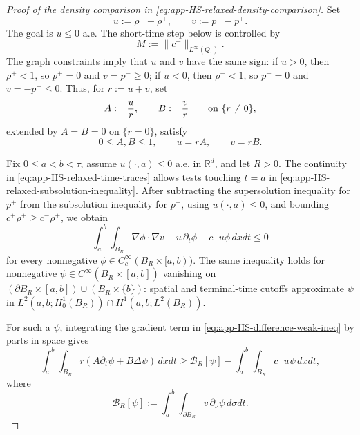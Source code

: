 \documentclass[11pt]{amsart}
\numberwithin{equation}{section}
\numberwithin{figure}{section}
\theoremstyle{plain}
\theoremstyle{definition}
\theoremstyle{remark}
\theoremstyle{plain}
\newcommand{\norm}[1]{\lVert #1 \rVert}
\def\R{\mathbb{R}}
\begin{document}
\begin{proof}[Proof of the density comparison in \eqref{eq:app-HS-relaxed-density-comparison}]
Set
\[
    u:=\rho^- -\rho^+,\qquad v:=p^- -p^+ .
\]
The goal is \(u\leq0\) a.e.  The short-time step below is controlled by
\begin{equation}\label{eq:app-HS-M-def}
    M:=\norm{c^-}_{L^\infty(Q_\tau)}.
\end{equation}
The graph constraints imply that \(u\) and \(v\) have the same sign:
if \(u>0\), then \(\rho^+<1\), so \(p^+=0\) and \(v=p^-\geq0\); if \(u<0\),
then \(\rho^-<1\), so \(p^-=0\) and \(v=-p^+\leq0\). Thus, for
\(r:=u+v\), set
\begin{equation}\label{eq:app-HS-AB-def}
    A:=\frac{u}{r},\qquad B:=\frac{v}{r}
    \qquad\hbox{on }\{r\neq0\},
\end{equation}
extended by \(A=B=0\) on \(\{r=0\}\), satisfy
\begin{equation}\label{eq:app-HS-AB-properties}
    0\leq A,B\leq1,\qquad u=rA,\qquad v=rB .
    \end{equation}

Fix \(0\leq a<b<\tau\), assume \(u(\cdot,a)\leq0\) a.e. in \(\R^d\), and
  let \(R>0\).  The continuity in
\eqref{eq:app-HS-relaxed-time-traces} allows tests touching \(t=a\) in
\eqref{eq:app-HS-relaxed-subsolution-inequality}.  After subtracting the
supersolution inequality for \(p^+\) from the subsolution inequality for
\(p^-\), using \(u(\cdot,a)\leq0\), and bounding
\(c^+\rho^+\geq c^-\rho^+\), we obtain
\begin{equation}\label{eq:app-HS-difference-weak-ineq}
    \int_a^b\!\!\int_{B_R}
    \nabla\phi\cdot\nabla v
    -u\,\partial_t\phi
    -c^-u\phi\,dxdt
    \leq0
\end{equation}
for every nonnegative \(\phi\in C_c^\infty(B_R\times[a,b))\).
The same inequality holds for nonnegative
\(\psi\in C^\infty(\overline{B_R}\times[a,b])\) vanishing on
\((\partial B_R\times[a,b])\cup(B_R\times\{b\})\): spatial and terminal-time
cutoffs approximate \(\psi\) in
\(L^2(a,b;H^1_0(B_R))\cap H^1(a,b;L^2(B_R))\).


For such a \(\psi\), integrating the gradient term in
\eqref{eq:app-HS-difference-weak-ineq} by parts in space gives
\begin{equation}\label{eq:app-HS-AB-ineq}
    \int_a^b\!\!\int_{B_R}
    r\left(A\partial_t\psi+B\Delta\psi\right)\,dxdt
    \geq
    \mathcal B_R[\psi]
    -\int_a^b\!\!\int_{B_R} c^-u\psi\,dxdt,
\end{equation}
where
\begin{equation}\label{eq:app-HS-boundary-term}
    \mathcal B_R[\psi]
    :=
    \int_a^b\!\!\int_{\partial B_R}
    v\,\partial_\nu\psi\,d\sigma dt .
\end{equation}


\end{proof}
\end{document}
